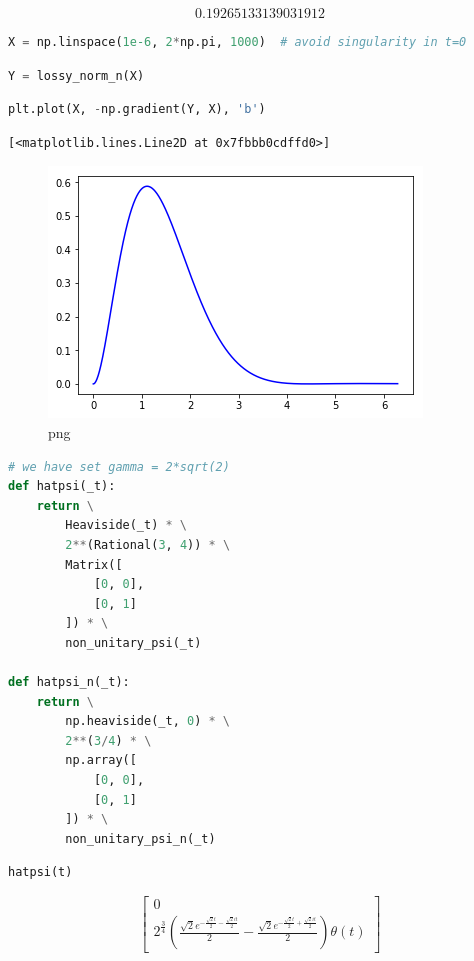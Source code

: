 \[0.19265133139031912\]

\begin{lstlisting}[language=Python]
X = np.linspace(1e-6, 2*np.pi, 1000)  # avoid singularity in t=0
\end{lstlisting}

\begin{lstlisting}[language=Python]
Y = lossy_norm_n(X)
\end{lstlisting}

\begin{lstlisting}[language=Python]
plt.plot(X, -np.gradient(Y, X), 'b')
\end{lstlisting}

\begin{lstlisting}
[<matplotlib.lines.Line2D at 0x7fbbb0cdffd0>]
\end{lstlisting}

\begin{figure}
\centering
\includegraphics[width=0.66\linewidth]{output_45_1.png}
\caption[]{png}
\end{figure}

\begin{lstlisting}[language=Python]
# we have set gamma = 2*sqrt(2)
def hatpsi(_t):
    return \
        Heaviside(_t) * \
        2**(Rational(3, 4)) * \
        Matrix([
            [0, 0],
            [0, 1]
        ]) * \
        non_unitary_psi(_t)
        
def hatpsi_n(_t):
    return \
        np.heaviside(_t, 0) * \
        2**(3/4) * \
        np.array([
            [0, 0],
            [0, 1]
        ]) * \
        non_unitary_psi_n(_t)
\end{lstlisting}

\begin{lstlisting}[language=Python]
hatpsi(t)
\end{lstlisting}

\begin{equation}\label{eq:sympy:hatpsi}
\left[\begin{matrix}0\\2^{\frac{3}{4}} \left(\frac{\sqrt{2} e^{- \frac{\sqrt{2} t}{2} - \frac{\sqrt{2} i t}{2}}}{2} - \frac{\sqrt{2} e^{- \frac{\sqrt{2} t}{2} + \frac{\sqrt{2} i t}{2}}}{2}\right) \theta\left(t\right)\end{matrix}\right]
\end{equation}

